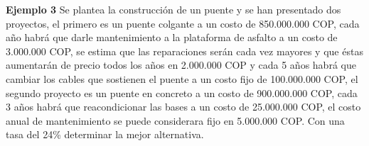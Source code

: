 \textbf{Ejemplo 3}\newline
Se plantea la construcción de un puente y se han presentado dos proyectos, el primero es un puente colgante a un costo de 850.000.000 COP, cada año habrá que darle mantenimiento a la plataforma de asfalto a un costo de 3.000.000 COP, se estima que las reparaciones serán cada vez mayores y que éstas aumentarán de precio todos los años en 2.000.000 COP y cada 5 años habrá que cambiar los cables que sostienen el puente a un costo fijo de 100.000.000 COP, el segundo proyecto es un puente en concreto a un costo de 900.000.000 COP, cada 3 años habrá que reacondicionar las bases a un costo de 25.000.000 COP, el costo anual de mantenimiento se puede considerara fijo en 5.000.000 COP. Con una tasa del 24\% determinar la mejor alternativa.

